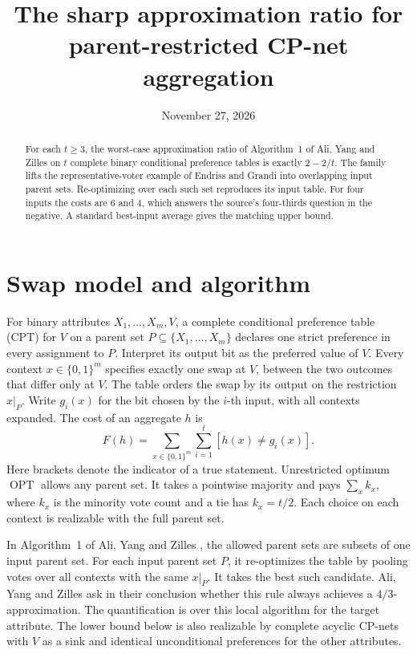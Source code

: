 \documentclass[11pt]{amsart}
\title{The sharp approximation ratio for parent-restricted CP-net aggregation}
\date{November 27, 2026}
\newcommand{\OPT}{\operatorname{OPT}}
\begin{document}
\begin{abstract}
For each \(t\ge3\), the worst-case approximation ratio of Algorithm~1
of Ali, Yang and Zilles on \(t\) complete binary conditional preference
tables is exactly \(2-2/t\). The family
lifts the representative-voter example of Endriss and Grandi into
overlapping input parent sets. Re-optimizing over each such set
reproduces its input table. For four inputs the costs are \(6\) and \(4\),
which answers the source's four-thirds question in the negative.
A standard best-input average gives the matching upper bound.
\end{abstract}
\maketitle

\section{Swap model and algorithm}
For binary attributes \(X_1,\ldots,X_m,V\), a complete conditional
preference table (CPT) for \(V\) on a parent set \(P\subseteq
\{X_1,\ldots,X_m\}\) declares one strict preference in every assignment
to \(P\). Interpret its output bit as the preferred value of \(V\).
Every context \(x\in\{0,1\}^m\) specifies exactly one swap at \(V\),
between the two outcomes that differ only at \(V\). The table orders the
swap by its output on the restriction \(x|_P\). Write \(g_i(x)\) for the
bit chosen by the \(i\)-th input, with all contexts expanded. The cost
of an aggregate \(h\) is
\[
  F(h)=\sum_{x\in\{0,1\}^m}\sum_{i=1}^t
        [h(x)\ne g_i(x)] .
\]
Here brackets denote the indicator of a true statement. Unrestricted optimum \(\OPT\) allows any parent set. It takes a
pointwise majority and pays \(\sum_x k_x\), where \(k_x\) is the
minority vote count and a tie has \(k_x=t/2\). Each choice on each
context is realizable with the full parent set.

In Algorithm~1 of Ali, Yang and Zilles \cite[pp.~10437--10438]{ayz},
the allowed parent sets are subsets of one input parent set. For each
input parent set \(P\), it re-optimizes the table by pooling votes over
all contexts with the same \(x|_P\). It takes the best such candidate.
Ali, Yang and Zilles ask in their conclusion whether this rule always
achieves a \(4/3\)-approximation. The quantification is over this local
algorithm for the target attribute. The lower bound below is also
realizable by complete acyclic CP-nets with \(V\) as a sink and
identical unconditional preferences for the other attributes.
\end{document}
